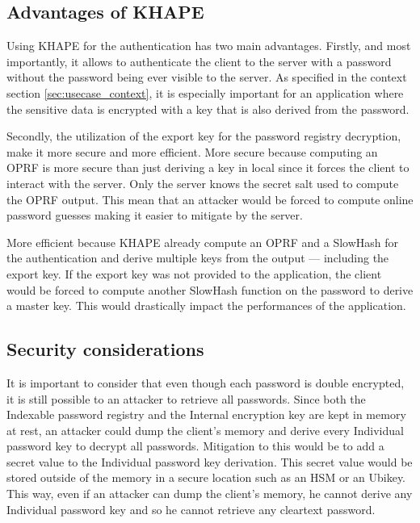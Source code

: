 ﻿\documentclass[../report.tex]{subfiles}
\begin{document}
\subsection{Advantages of KHAPE}
Using KHAPE for the authentication has two main advantages.
Firstly, and most importantly, it allows to authenticate the client to the server with a password without the password being ever visible to the server. As specified in the context section \ref{sec:usecase_context}, it is especially important for an application where the sensitive data is encrypted with a key that is also derived from the password.

Secondly, the utilization of the export key for the password registry decryption, make it more secure and more efficient.
More secure because computing an OPRF is more secure than just deriving a key in local since it forces the client to interact with the server. Only the server knows the secret salt used to compute the OPRF output. 
This mean that an attacker would be forced to compute online password guesses making it easier to mitigate by the server.

More efficient because KHAPE already compute an OPRF and a SlowHash for the authentication and derive multiple keys from the output --- including the export key.
If the export key was not provided to the application, the client would be forced to compute another SlowHash function on the password to derive a master key. This would drastically impact the performances of the application.


\subsection{Security considerations}
It is important to consider that even though each password is double encrypted, it is still possible to an attacker to retrieve all passwords. Since both the Indexable password registry and the Internal encryption key are kept in memory at rest, an attacker could dump the client's memory and derive every Individual password key to decrypt all passwords.
Mitigation to this would be to add a secret value to the Individual password key derivation. This secret value would be stored outside of the memory in a secure location such as an HSM or an Ubikey. This way, even if an attacker can dump the client's memory, he cannot derive any Individual password key and so he cannot retrieve any cleartext password. 

% 
% 
% 
\end{document}
